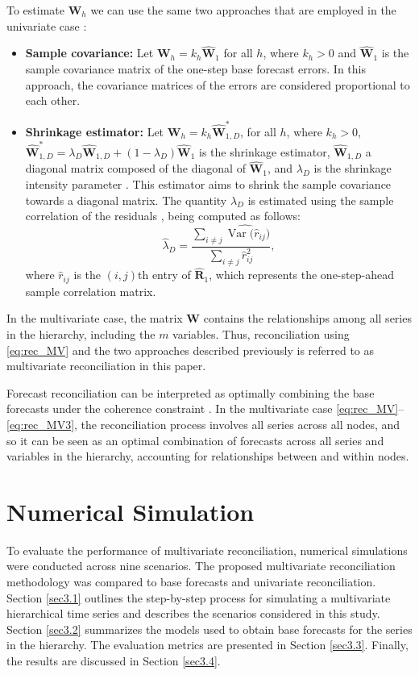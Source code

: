 \documentclass[a4paper,preprint,11pt,authoryear]{elsarticle}
\DeclareMathOperator{\Var}{Var}
\begin{document}
To estimate $\bm{W}_h$ we can use the same two approaches that are employed in the univariate case \citep{wickramasuriya2019optimal}:
\begin{itemize}
  \item\textbf{Sample covariance:} Let $\bm{W}_h = k_h\hat{\bm{W}}_1$ for all $h$, where $k_h > 0$ and $\widehat{\bm{W}}_1$ is the sample covariance  matrix of the one-step base forecast errors. In this approach, the covariance matrices of the errors are considered proportional to each other.
  \item\textbf{Shrinkage estimator:} Let $\bm{W}_h = k_h\hat{\bm{W}}_{1,D}^*$, for all $h$, where $k_h > 0$, $\hat{\bm{W}}_{1,D}^* = \lambda_D\hat{\bm{W}}_{1,D}+(1-\lambda_D)\hat{\bm{W}}_{1}$ is the shrinkage estimator, $\hat{\bm{W}}_{1,D}$ a diagonal matrix composed of the diagonal of $\hat{\bm{W}}_{1}$, and $\lambda_D$ is the shrinkage intensity parameter \citep{wickramasuriya2019optimal}. This estimator aims to shrink the sample covariance towards a diagonal matrix. The quantity $\lambda_D$ is estimated using the sample correlation of the residuals \citep{schafer2005shrinkage}, being computed as follows:
    \begin{equation*}
      \hat{\lambda}_D = \frac{\sum_{i\ne j}\widehat{\Var(\hat{r}_{ij}})}{\sum_{i\ne j}\hat{r}_{ij}^2},
    \end{equation*}
    where $\hat{r}_{ij}$ is the $(i,j)$th entry of $\hat{\bm{R}}_1$, which represents the one-step-ahead sample correlation matrix.
\end{itemize}

In the multivariate case, the matrix $\bm{W}$ contains the relationships among all series in the hierarchy, including the $m$ variables. Thus, reconciliation using \eqref{eq:rec_MV} and the two approaches described previously is referred to as multivariate reconciliation in this paper.

Forecast reconciliation can be interpreted as optimally combining the base forecasts under the coherence constraint \citep{hyndman2011optimal}. In the multivariate case \eqref{eq:rec_MV}--\eqref{eq:rec_MV3}, the reconciliation process involves all series across all nodes, and so it can be seen as an optimal combination of forecasts across all series and variables in the hierarchy, accounting for relationships between and within nodes.

\section{Numerical Simulation}
\label{sec3}
To evaluate the performance of multivariate reconciliation, numerical simulations were conducted across nine scenarios. The proposed multivariate reconciliation methodology was compared to base forecasts and univariate reconciliation. Section \ref{sec3.1} outlines the step-by-step process for simulating a multivariate hierarchical time series and describes the scenarios considered in this study. Section \ref{sec3.2} summarizes the models used to obtain base forecasts for the series in the hierarchy. The evaluation metrics are presented in Section \ref{sec3.3}. Finally, the results are discussed in Section \ref{sec3.4}.
\end{document}
